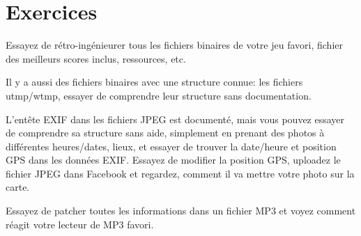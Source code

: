 \section{Exercices}

Essayez de rétro-ingénieurer tous les fichiers binaires de votre jeu favori, fichier
des meilleurs scores inclus, ressources, etc.

Il y a aussi des fichiers binaires avec une structure connue: les fichiers utmp/wtmp,
essayer de comprendre leur structure sans documentation.

L'entête EXIF dans les fichiers JPEG est documenté, mais vous pouvez essayer de comprendre
sa structure sans aide, simplement en prenant des photos à différentes heures/dates,
lieux, et essayer de trouver la date/heure et position GPS dans les données EXIF.
Essayez de modifier la position GPS, uploadez le fichier JPEG dans Facebook et regardez,
comment il va mettre votre photo sur la carte.

Essayez de patcher toutes les informations dans un fichier MP3 et voyez comment réagit
votre lecteur de MP3 favori.
